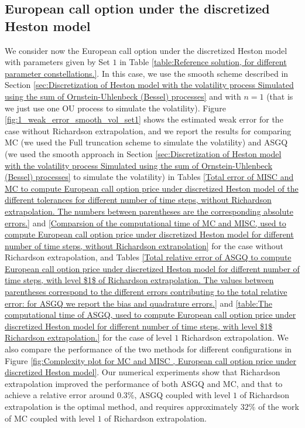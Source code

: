 \subsection{European call option  under the discretized  Heston model}\label{sec:European call option  under the discretized  Heston model with parameters of Set 1}
We consider now  the European call option  under the discretized  Heston model  with parameters given by Set $1$ in Table \ref{table:Reference solution, for different parameter constellations.}. In this case, we use the smooth scheme described  in  Section \ref{sec:Discretization of Heston model with the volatility process Simulated using the sum of  Ornstein-Uhlenbeck (Bessel) processes} and with  $n=1$ (that is we just use one OU process to simulate the volatility). Figure \ref{fig:1_weak_error_smooth_vol_set1} shows the estimated weak error  for the case without Richardson extrapolation, and we report the results for comparing MC (we used the Full truncation scheme to simulate the volatility) and ASGQ (we used the smooth approach in Section \ref{sec:Discretization of Heston model with the volatility process Simulated using the sum of  Ornstein-Uhlenbeck (Bessel) processes} to simulate the volatility) in Tables \ref{Total error of MISC and MC to compute European call option price under discretized Heston model of the different tolerances for different number of time steps, without Richardson extrapolation. The numbers between parentheses are the corresponding absolute errors.} and \ref{Comparsion of the computational time of  MC and MISC, used to compute European call option price under discretized Heston model for different number of time steps, without Richardson extrapolation} for the case without Richardson extrapolation, and  Tables \ref{Total relative  error of ASGQ  to compute European call option price under discretized Heston model for different number of time steps, with level $1$ of Richardson extrapolation. The values between parentheses correspond to the different errors contributing to the total relative error: for ASGQ we report the bias and quadrature errors.} and \ref{table:The computational time of  ASGQ, used to compute European call option price under discretized Heston model for different number of time steps, with level $1$ Richardson extrapolation.} for the case of level $1$ Richardson extrapolation. We also compare the performance of the two methods for different configurations in  Figure \ref{fig:Complexity plot for MC and MISC , European call option price under discretized Heston model}.  Our numerical experiments show that Richardson extrapolation improved the performance of both ASGQ and MC, and that to achieve a relative error around $0.3\%$, ASGQ  coupled with level $1$ of Richardson extrapolation is the optimal method, and  requires approximately $32\%$ of the work of MC  coupled with level $1$ of Richardson extrapolation. 
 
